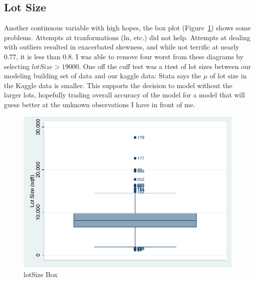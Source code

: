 \documentclass[twocolumn,11pt]{article}
\begin{document}
\subsection*{Lot Size}
Another continuous variable with high hopes, the box plot (Figure~\ref{fig:lotSize-box}) shows some problems.
Attempts at tranformations (ln, etc.) did not help.
Attempts at dealing with outliers resulted in exacerbated skewness,
and while not terrific at nearly $0.77$, it is less than $0.8$.
I was able to remove four worst from these diagrams by selecting $lotSize > 19000$.
One off the cuff test was a ttest of lot sizes between our modeling building set of data and our kaggle data:
Stata says the $\mu$ of lot size in the Kaggle data is smaller.
This supports the decision to model without the larger lots,
hopefully trading overall accuracy of the model
for a model that will guess better at the unknown observations I have in front of me.
\begin{figure}[H]
  \centering
  \includegraphics[width=.9\linewidth]{figures/lotSize-box.pdf}
  \caption{lotSize Box}
  \label{fig:lotSize-box}
\end{figure}

\end{document}
